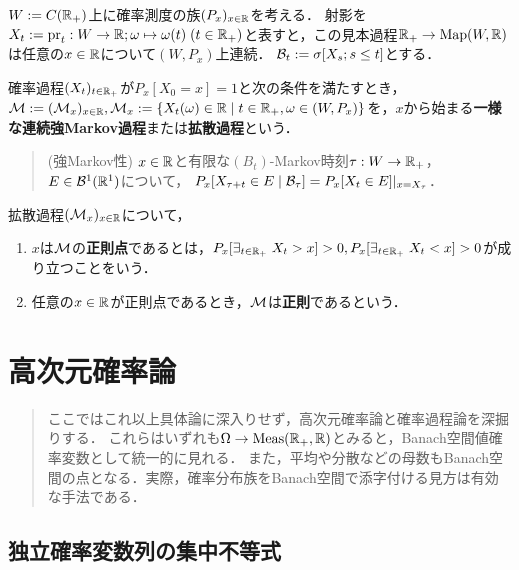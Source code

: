 \documentclass[uplatex,dvipdfmx]{jsreport}
\begin{document}
\begin{notation}
    $W:=C(\mathbb{R}_+)$上に確率測度の族$(P_x)_{x\in\mathbb{R}}$を考える．
    射影を$X_t:=\mathrm{pr}_t:W\to\mathbb{R};\omega\mapsto\omega(t)\;(t\in\mathbb{R}_+)$と表すと，この見本過程$\mathbb{R}_+\to\mathrm{Map}(W,\mathbb{R})$は任意の$x\in\mathbb{R}$について$(W,P_x)$上連続．
    $\mathcal{B}_t:=\sigma[X_s;s\le t]$とする．
\end{notation}

\begin{definition}
    確率過程$(X_t)_{t\in\mathbb{R}_+}$が$P_x[X_0=x]=1$と次の条件を満たすとき，$\mathcal{M}:=(\mathcal{M}_x)_{x\in\mathbb{R}},\mathcal{M}_x:=\left\{X_t(\omega)\in\mathbb{R}\mid t\in\mathbb{R}_+,\omega\in(W,P_x)\right\}$を，$x$から始まる\textbf{一様な連続強Markov過程}または\textbf{拡散過程}という．
    \begin{quote}
        (強Markov性) $x\in\mathbb{R}$と有限な$(B_t)$-Markov時刻$\tau:W\to\mathbb{R}_+$，$E\in\mathcal{B}^1(\mathbb{R}^1)$について，
        $P_x[X_{\tau+t}\in E\mid\mathcal{B}_\tau]=P_x[X_t\in E]|_{x=X_\tau}$．
    \end{quote}
\end{definition}

\begin{definition}
    拡散過程$(\mathcal{M}_x)_{x\in\mathbb{R}}$について，
    \begin{enumerate}
        \item $x$は$\mathcal{M}$の\textbf{正則点}であるとは，$P_x[\exists_{t\in\mathbb{R}_+}\;X_t>x]>0,P_x[\exists_{t\in\mathbb{R}_+}\;X_t<x]>0$が成り立つことをいう．
        \item 任意の$x\in\mathbb{R}$が正則点であるとき，$\mathcal{M}$は\textbf{正則}であるという．
    \end{enumerate}
\end{definition}

\chapter{高次元確率論}

\begin{quotation}
    ここではこれ以上具体論に深入りせず，高次元確率論と確率過程論を深掘りする．
    これらはいずれも$\Omega\to\mathrm{Meas}(\mathbb{R}_+,\mathbb{R})$とみると，Banach空間値確率変数として統一的に見れる．
    また，平均や分散などの母数もBanach空間の点となる．実際，確率分布族をBanach空間で添字付ける見方は有効な手法である．
\end{quotation}

\section{独立確率変数列の集中不等式}
\end{document}

